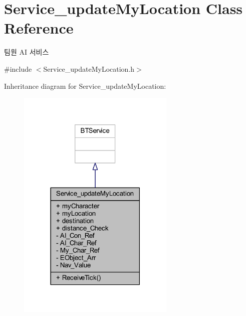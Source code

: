 \hypertarget{class_service__update_my_location}{}\section{Service\+\_\+update\+My\+Location Class Reference}
\label{class_service__update_my_location}


팀원 AI 서비스  




{\ttfamily \#include $<$Service\+\_\+update\+My\+Location.\+h$>$}



Inheritance diagram for Service\+\_\+update\+My\+Location\+:
\nopagebreak
\begin{figure}[H]
\begin{center}
\leavevmode
\includegraphics[width=213pt]{class_service__update_my_location__inherit__graph}
\end{center}
\end{figure}


